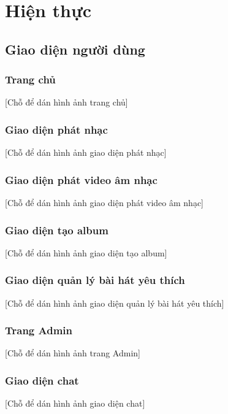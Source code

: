\chapter{Hiện thực}
\label{ch:implementation}

\section{Giao diện người dùng}
\label{sec:frontend_implementation}

\subsection{Trang chủ}
\label{subsec:homepage_ui}
[Chỗ để dán hình ảnh trang chủ]

\subsection{Giao diện phát nhạc}
\label{subsec:music_player_ui}
[Chỗ để dán hình ảnh giao diện phát nhạc]

\subsection{Giao diện phát video âm nhạc}
\label{subsec:video_player_ui}
[Chỗ để dán hình ảnh giao diện phát video âm nhạc]

\subsection{Giao diện tạo album}
\label{subsec:create_album_ui}
[Chỗ để dán hình ảnh giao diện tạo album]

\subsection{Giao diện quản lý bài hát yêu thích}
\label{subsec:favorite_songs_ui}
[Chỗ để dán hình ảnh giao diện quản lý bài hát yêu thích]

\subsection{Trang Admin}
\label{subsec:admin_ui}
[Chỗ để dán hình ảnh trang Admin]

\subsection{Giao diện chat}
\label{subsec:chat_ui}
[Chỗ để dán hình ảnh giao diện chat]

